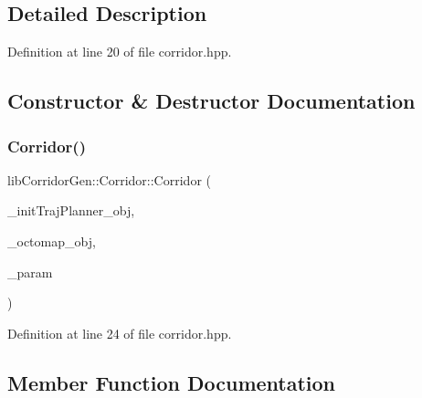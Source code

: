 \subsection{Detailed Description}


Definition at line 20 of file corridor.\+hpp.



\subsection{Constructor \& Destructor Documentation}
\mbox{\label{classlib_corridor_gen_1_1_corridor_aeed77ae6b1e91f67df1d5f0d05de9f72}} 
\subsubsection{\texorpdfstring{Corridor()}{Corridor()}}
{\footnotesize\ttfamily lib\+Corridor\+Gen\+::\+Corridor\+::\+Corridor (\begin{DoxyParamCaption}\item[{std\+::shared\+\_\+ptr$<$ \hyperlink{classlib_corridor_gen_1_1_init_traj_planner}{Init\+Traj\+Planner} $>$}]{\+\_\+init\+Traj\+Planner\+\_\+obj,  }\item[{std\+::shared\+\_\+ptr$<$ octomap\+::\+Oc\+Tree $>$}]{\+\_\+octomap\+\_\+obj,  }\item[{\hyperlink{classlib_corridor_gen_1_1_param}{Param}}]{\+\_\+param }\end{DoxyParamCaption})\hspace{0.3cm}{\ttfamily [inline]}}



Definition at line 24 of file corridor.\+hpp.



\subsection{Member Function Documentation}
\mbox{\label{classlib_corridor_gen_1_1_corridor_ac909b465688a8a5e50c6740f20c1b8bd}} 
